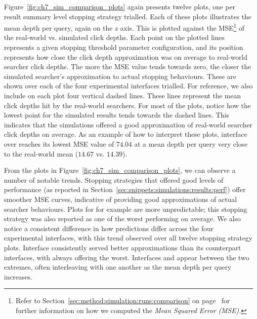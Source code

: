 Figure~\ref{fig:ch7_sim_comparison_plots} again presents twelve plots, one per result summary level stopping strategy trialled. Each of these plots illustrates the mean depth per query, again on the \emph{x} axis. This is plotted against the MSE\footnote{Refer to Section~\ref{sec:method:simulation:runs:comparison} on page~\pageref{sec:method:simulation:runs:comparison} for further information on how we computed the \emph{Mean Squared Error (MSE).}} of the real-world vs. simulated click depths. Each point on the plotted lines represents a given stopping threshold parameter configuration, and its position represents how close the click depth approximation was on average to real-world searcher click depths. The more the MSE value tends towards zero, the closer the simulated searcher's approximation to actual stopping behaviours. These are shown over each of the four experimental interfaces trialled. For reference, we also include on each plot four vertical dashed lines. These lines represent the mean click depths hit by the real-world searchers. For most of the plots, notice how the lowest point for the simulated results tends towards the dashed lines. This indicates that the simulations offered a good approximation of real-world searcher click depths on average. As an example of how to interpret these plots, interface  over  reaches its lowest MSE value of $74.04$ at a mean depth per query very close to the real-world mean ($14.67$ vs. $14.39$).

From the plots in Figure~\ref{fig:ch7_sim_comparison_plots}, we can observe a number of notable trends. Stopping strategies that offered good levels of performance (as reported in Section~\ref{sec:snippets:simulations:results:perf}) offer smoother MSE curves, indicative of providing good approximations of actual searcher behaviours. Plots for  for example are more unpredictable; this stopping strategy was also reported as one of the worst performing on average. We also notice a consistent difference in how predictions differ across the four experimental interfaces, with this trend observed over all twelve stopping strategy plots. Interface  consistently served better approximations than its counterpart interfaces, with  always offering the worst. Interfaces  and  appear between the two extremes, often interleaving with one another as the mean depth per query increases.

